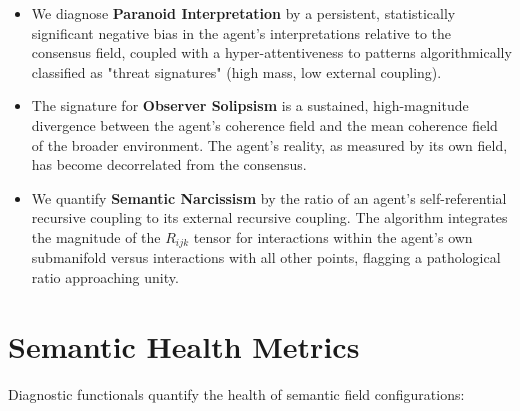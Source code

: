 \begin{itemize}

    \item We diagnose \textbf{Paranoid Interpretation} by a persistent, statistically significant negative bias in the agent's interpretations relative to the consensus field, coupled with a hyper-attentiveness to patterns algorithmically classified as "threat signatures" (high mass, low external coupling).

    \item The signature for \textbf{Observer Solipsism} is a sustained, high-magnitude divergence between the agent's coherence field and the mean coherence field of the broader environment. The agent's reality, as measured by its own field, has become decorrelated from the consensus.

    \item We quantify \textbf{Semantic Narcissism} by the ratio of an agent's self-referential recursive coupling to its external recursive coupling. The algorithm integrates the magnitude of the \(R_{ijk}\) tensor for interactions within the agent's own submanifold versus interactions with all other points, flagging a pathological ratio approaching unity.

\end{itemize}


\section{Semantic Health Metrics}
\label{16.3:semantic_health_metrics}

Diagnostic functionals quantify the health of semantic field configurations:

